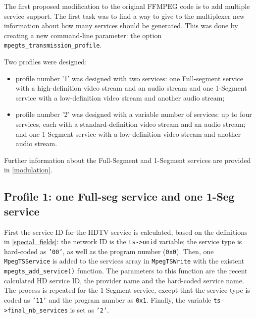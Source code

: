 \documentclass[
	12pt,				%
	openright,			%
	twoside,			%
	a4paper,			%
	brazil,
	french,				%
	english
	]{abntex2}
\begin{document}
The first proposed modification to the original FFMPEG code is to add multiple service support. The first task was to find a way to give to the multiplexer new information about how many services should be generated. This was done by creating a new command-line parameter: the option \texttt{mpegts\hspace{0.1mm}\_\hspace{0.1mm}transmission\hspace{0.1mm}\_\hspace{0.1mm}profile}.

Two profiles were designed:
\begin{itemize}
\item profile number '1' was designed with two services: one Full-segment service with a high-definition video stream and an audio stream and one 1-Segment service with a low-definition video stream and another audio stream;
\item profile number '2' was designed with a variable number of services: up to four services, each with a standard-definition video stream and an audio stream; and one  1-Segment service with a low-definition video stream and another audio stream.
\end{itemize}

Further information about the Full-Segment and 1-Segment services are provided in \autoref{modulation}.

\subsection{Profile 1: one Full-seg service and one 1-Seg service}

First the service ID for the HDTV service is calculated, based on the definitions in \autoref{special_fields}: the network ID is the \texttt{ts->onid} variable; the service type is hard-coded as \texttt{'00'}, as well as the program number (\texttt{0x0}). Then, one \texttt{MpegTSService} is added to the services array in \texttt{MpegTSWrite} with the existent \texttt{mpegts\hspace{0.1mm}\_\hspace{0.1mm}add\hspace{0.1mm}\_\hspace{0.1mm}service()} function. The parameters to this function are the recent calculated HD service ID, the provider name and the hard-coded service name. The process is repeated for the 1-Segment service, except that the service type is coded as \texttt{'11'} and the program number as \texttt{0x1}. Finally, the variable \texttt{ts->final\hspace{0.1mm}\_\hspace{0.1mm}nb\hspace{0.1mm}\_\hspace{0.1mm}services} is set as \texttt{'2'}.
\end{document}
